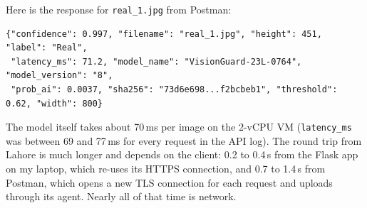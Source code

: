 Here is the response for \texttt{real\_1.jpg} from Postman:
{\small\begin{verbatim}
{"confidence": 0.997, "filename": "real_1.jpg", "height": 451, "label": "Real",
 "latency_ms": 71.2, "model_name": "VisionGuard-23L-0764", "model_version": "8",
 "prob_ai": 0.0037, "sha256": "73d6e698...f2bcbeb1", "threshold": 0.62, "width": 800}
\end{verbatim}}
The model itself takes about 70\,ms per image on the 2-vCPU VM (\texttt{latency\_ms} was between
69 and 77\,ms for every request in the API log). The round trip from Lahore is much longer and
depends on the client: 0.2 to 0.4\,s from the Flask app on my laptop, which re-uses its HTTPS
connection, and 0.7 to 1.4\,s from Postman, which opens a new TLS connection for each request and
uploads through its agent. Nearly all of that time is network.
